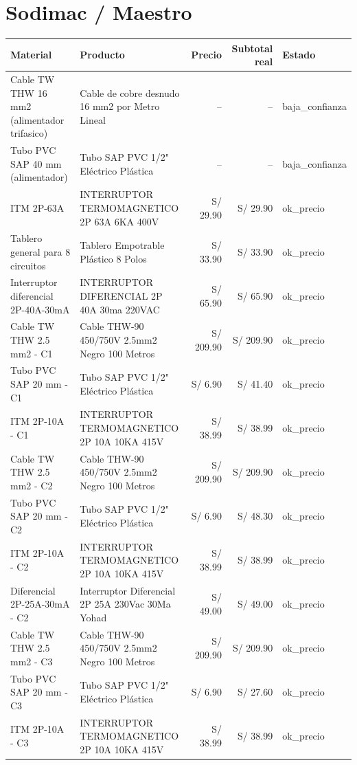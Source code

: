 \documentclass[11pt,a4paper]{article}
\begin{document}
\section{Sodimac / Maestro}
\begin{longtable}{p{} p{} r r p{}}
\toprule Material & Producto & Precio & Subtotal real & Estado \\ \midrule\endhead
Cable TW THW 16 mm2 (alimentador trifasico) & Cable de cobre desnudo 16 mm2 por Metro Lineal & -- & -- & baja\_confianza \\
Tubo PVC SAP 40 mm (alimentador) & Tubo SAP PVC 1/2" Eléctrico Plástica & -- & -- & baja\_confianza \\
ITM 2P-63A & INTERRUPTOR TERMOMAGNETICO 2P 63A 6KA 400V & S/ 29.90 & S/ 29.90 & ok\_precio \\
Tablero general para 8 circuitos & Tablero Empotrable Plástico 8 Polos & S/ 33.90 & S/ 33.90 & ok\_precio \\
Interruptor diferencial 2P-40A-30mA & INTERRUPTOR DIFERENCIAL 2P 40A 30ma 220VAC & S/ 65.90 & S/ 65.90 & ok\_precio \\
Cable TW THW 2.5 mm2 - C1 & Cable THW-90 450/750V 2.5mm2 Negro 100 Metros & S/ 209.90 & S/ 209.90 & ok\_precio \\
Tubo PVC SAP 20 mm - C1 & Tubo SAP PVC 1/2" Eléctrico Plástica & S/ 6.90 & S/ 41.40 & ok\_precio \\
ITM 2P-10A - C1 & INTERRUPTOR TERMOMAGNETICO 2P 10A 10KA 415V & S/ 38.99 & S/ 38.99 & ok\_precio \\
Cable TW THW 2.5 mm2 - C2 & Cable THW-90 450/750V 2.5mm2 Negro 100 Metros & S/ 209.90 & S/ 209.90 & ok\_precio \\
Tubo PVC SAP 20 mm - C2 & Tubo SAP PVC 1/2" Eléctrico Plástica & S/ 6.90 & S/ 48.30 & ok\_precio \\
ITM 2P-10A - C2 & INTERRUPTOR TERMOMAGNETICO 2P 10A 10KA 415V & S/ 38.99 & S/ 38.99 & ok\_precio \\
Diferencial 2P-25A-30mA - C2 & Interruptor Diferencial 2P 25A 230Vac 30Ma Yohad & S/ 49.00 & S/ 49.00 & ok\_precio \\
Cable TW THW 2.5 mm2 - C3 & Cable THW-90 450/750V 2.5mm2 Negro 100 Metros & S/ 209.90 & S/ 209.90 & ok\_precio \\
Tubo PVC SAP 20 mm - C3 & Tubo SAP PVC 1/2" Eléctrico Plástica & S/ 6.90 & S/ 27.60 & ok\_precio \\
ITM 2P-10A - C3 & INTERRUPTOR TERMOMAGNETICO 2P 10A 10KA 415V & S/ 38.99 & S/ 38.99 & ok\_precio \\

\end{longtable}
\end{document}
